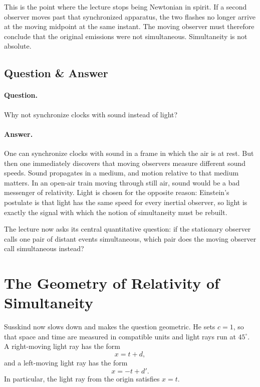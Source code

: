 This is the point where the lecture stops being Newtonian in spirit. If a second observer moves past that synchronized apparatus, the two flashes no longer arrive at the moving midpoint at the same instant. The moving observer must therefore conclude that the original emissions were not simultaneous. Simultaneity is not absolute.

\subsection{Question \& Answer}

\paragraph{Question.} Why not synchronize clocks with sound instead of light?

\paragraph{Answer.} One can synchronize clocks with sound in a frame in which the air is at rest. But then one immediately discovers that moving observers measure different sound speeds. Sound propagates in a medium, and motion relative to that medium matters. In an open-air train moving through still air, sound would be a bad messenger of relativity. Light is chosen for the opposite reason: Einstein's postulate is that light has the same speed for every inertial observer, so light is exactly the signal with which the notion of simultaneity must be rebuilt.

The lecture now asks its central quantitative question: if the stationary observer calls one pair of distant events simultaneous, which pair does the moving observer call simultaneous instead?

\section{The Geometry of Relativity of Simultaneity}

Susskind now slows down and makes the question geometric. He sets \(c=1\), so that space and time are measured in compatible units and light rays run at \(45^\circ\). A right-moving light ray has the form
\begin{equation}
x=t+d,
\end{equation}
and a left-moving light ray has the form
\begin{equation}
x=-t+d'.
\end{equation}
In particular, the light ray from the origin satisfies \(x=t\).

